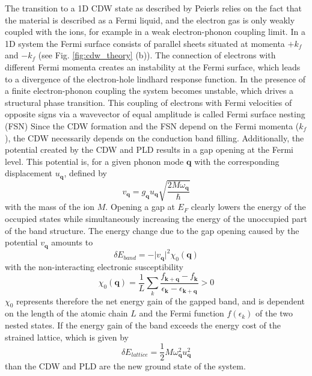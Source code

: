 The transition to a 1D CDW state as described by Peierls relies on the fact that the material is described as a Fermi liquid, and the electron gas is only weakly coupled with the ions, for example in a weak electron-phonon coupling limit.
In a 1D system the Fermi surface consists of parallel sheets situated at momenta $+k_f$ and $-k_f$ (see Fig. \ref{fig:cdw_theory} (b)).
The connection of electrons with different Fermi momenta creates an instability at the Fermi surface, which leads to a divergence of the electron-hole lindhard response function.
In the presence of a finite electron-phonon coupling the system becomes unstable, which drives a structural phase transition.
This coupling of electrons with Fermi velocities of opposite signs via a wavevector of equal amplitude is called Fermi surface nesting (FSN)
Since the CDW formation and the FSN depend on the Fermi momenta ($k_f$), the CDW necessarily depends on the conduction band filling.
Additionally, the potential created by the CDW and PLD results in a gap opening at the Fermi level.
This potential is, for a given phonon mode $\mathbf{q}$ with the corresponding displacement $u_\mathbf{q}$, defined by
\begin{equation}
	v_\mathbf{q} = g_\mathbf{q} u_\mathbf{q} \sqrt{\frac{2M\omega_\mathbf{q}}{\hbar}}
\end{equation}
with the mass of the ion $M$.
Opening a gap at $E_F$ clearly lowers the energy of the occupied states while simultaneously increasing the energy of the unoccupied part of the band structure.
The energy change due to the gap opening caused by the potential $v_\mathbf{q}$ amounts to
\begin{equation}
	\delta E_{band} = -\lvert v_\mathbf{q}\rvert^2 \chi_0(\mathbf{q})
\end{equation}
with the non-interacting electronic susceptibility
\begin{equation}
	\chi_0(\mathbf{q}) = \frac{1}{L} \sum_{k}^{} \frac{f_{\mathbf{k}+\mathbf{q}}-f_\mathbf{k}}{\epsilon_\mathbf{k}-\epsilon_{\mathbf{k}+\mathbf{q}}}>0
	\label{eq:susz}
\end{equation}
$\chi_0$ represents therefore the net energy gain of the gapped band, and is dependent on the length of the atomic chain $L$ and the Fermi function $f(\epsilon_k)$ of the two nested states.
If the energy gain of the band exceeds the energy cost of the  strained lattice, which is given by
\begin{equation}
	\delta E_{lattice} = \frac{1}{2} M\omega_\mathbf{q}^2 u_\mathbf{q}^2
\end{equation}
than the CDW and PLD are the new ground state of the system.

